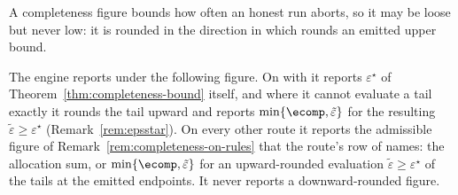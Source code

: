 
A completeness figure bounds how often an honest run aborts, so it may be
loose but never low: it is rounded in the direction in which
 rounds an emitted upper bound.

\begin{requirement}\label{req:completeness-report}
The engine reports under  the following figure.
On  with  it
reports $\varepsilon^{\star}$ of Theorem~\ref{thm:completeness-bound} itself, and where it
cannot evaluate a tail exactly it rounds the tail upward and reports
$\min\{\ecomp,\tilde\varepsilon\}$ for the resulting
$\tilde\varepsilon\ge\varepsilon^{\star}$ (Remark~\ref{rem:epsstar}). On
every other route it reports the admissible figure of
Remark~\ref{rem:completeness-on-rules} that the route's row of
 names: the allocation sum, or
$\min\{\ecomp,\tilde\varepsilon\}$ for an upward-rounded evaluation
$\tilde\varepsilon\ge\varepsilon^{\star}$ of the tails at the emitted
endpoints. It never reports a downward-rounded figure.
\end{requirement}
